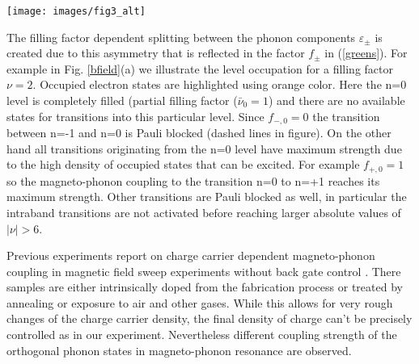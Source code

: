 \documentclass[prl,aps,superscriptaddress,showpacs,reprint]{revtex4-1}
\begin{document}
\begin{figure*}
   \texttt{[image: images/fig3\_alt]}
   \caption{\label{bfield} a)Schematic view of the Landau level spectrum at B=12.6T, filling factor $\nu=2$ and Landau level transitions participating in magneto-phonon coupling. Filled electronic states are highlighted using orange color. Red and blue arrows show transitions allowed by the selection rule $\Delta\left|n\right|= \pm 1$. Dashed arrows mark Pauli blocked transitions. Circular arrows represent the angular momentum involved in the transitions b) Relative strength and filling factor dependence of individual terms of the phonon self energy. Terms describing interband transitions are shaded red, intraband transitions are shaded green  c) Position of the graphene G-band during a gatesweep at $B=12.6T$. The energy of the G-Band was extracted from two-peak Lorentz fits to Raman spectra. Vertical orange lines mark specific filling factors at $\nu=-6,-2,0,2,6$ where the n=-1,0,1 levels are completely filled/depleted with charge carriers ($\nu=0$ - half filling of n=0 level). The calculated magneto-phonon energies according to equation \ref{greens} are plotted as solid red($\Delta n = +1$) and solid blue($\Delta n = -1$) lines. Dashed lines include $\Delta n = 0$ transitions.}
\end{figure*}

The filling factor dependent splitting between the phonon components $\varepsilon_{\pm}$ is created due to this asymmetry that is reflected in the factor $f_{\pm}$ in (\ref{greens}). For example in Fig. \ref{bfield}(a) we illustrate the level occupation for a filling factor $\nu=2$. Occupied electron states are highlighted using orange color. Here the n=0 level is completely filled (partial filling factor ($\bar{\nu}_0=1$) and there are no available states for transitions into this particular level. Since $f_{-,0}=0$ the transition between n=-1 and n=0 is Pauli blocked (dashed lines in figure). On the other hand all transitions originating from the n=0 level have maximum strength due to the high density of occupied states that can be excited. For example $f_{+,0}=1$ so the magneto-phonon coupling to the transition n=0 to n=+1 reaches its maximum strength. Other transitions are Pauli blocked as well, in particular the intraband transitions are not activated before reaching larger absolute values of $\left|\nu\right|>6$.

Previous experiments report on charge carrier dependent magneto-phonon coupling in magnetic field sweep experiments without back gate control \cite{PhysRevLett.110.227402,kossacki2012circular}. There samples are either intrinsically doped from the fabrication process or treated by annealing or exposure to air and other gases. While this allows for very rough changes of the charge carrier density, the final density of charge can't be precisely controlled as in our experiment. Nevertheless different coupling strength of the orthogonal phonon states in magneto-phonon resonance are observed.
\end{document}
